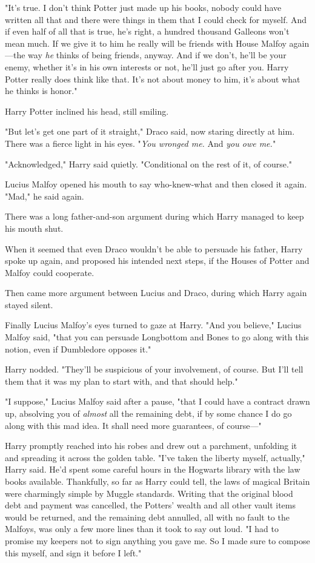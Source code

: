 "It's true. I don't think Potter just made up his books, nobody could have 
written all that and there were things in them that I could check for myself. 
And if even half of all that is true, he's right, a hundred thousand Galleons 
won't mean much. If we give it to him he really will be friends with House 
Malfoy again---the way \emph{he} thinks of being friends, anyway. And if we 
don't, he'll be your enemy, whether it's in his own interests or not, he'll 
just go after you. Harry Potter really does think like that. It's not about 
money to him, it's about what he thinks is honor."

Harry Potter inclined his head, still smiling.

"But let's get one part of it straight," Draco said, now staring directly at 
him. There was a fierce light in his eyes. "\emph{You wronged me.} And 
\emph{you owe me.}"

"Acknowledged," Harry said quietly. "Conditional on the rest of it, of course."

Lucius Malfoy opened his mouth to say who-knew-what and then closed it again. 
"Mad," he said again.

There was a long father-and-son argument during which Harry managed to keep his 
mouth shut.

When it seemed that even Draco wouldn't be able to persuade his father, Harry 
spoke up again, and proposed his intended next steps, if the Houses of Potter 
and Malfoy could cooperate.

Then came more argument between Lucius and Draco, during which Harry again 
stayed silent.

Finally Lucius Malfoy's eyes turned to gaze at Harry. "And you believe," Lucius 
Malfoy said, "that you can persuade Longbottom and Bones to go along with this 
notion, even if Dumbledore opposes it."

Harry nodded. "They'll be suspicious of your involvement, of course. But I'll 
tell them that it was my plan to start with, and that should help."

"I suppose," Lucius Malfoy said after a pause, "that I could have a contract 
drawn up, absolving you of \emph{almost} all the remaining debt, if by some 
chance I do go along with this mad idea. It shall need more guarantees, of 
course---"

Harry promptly reached into his robes and drew out a parchment, unfolding it 
and spreading it across the golden table. "I've taken the liberty myself, 
actually," Harry said. He'd spent some careful hours in the Hogwarts library 
with the law books available. Thankfully, so far as Harry could tell, the laws 
of magical Britain were charmingly simple by Muggle standards. Writing that the 
original blood debt and payment was cancelled, the Potters' wealth and all 
other vault items would be returned, and the remaining debt annulled, all with 
no fault to the Malfoys, was only a few more lines than it took to say out 
loud. "I had to promise my keepers not to sign anything you gave me. So I made 
sure to compose this myself, and sign it before I left."

